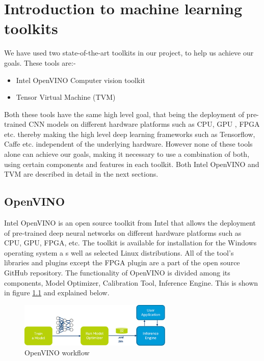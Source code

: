 \chapter{Introduction to machine learning toolkits}
We have used two state-of-the-art toolkits in our project, to help us achieve our goals. These tools are:-
\begin{itemize}
    \item Intel OpenVINO Computer vision toolkit
    \item Tensor Virtual Machine (TVM)
\end{itemize}
Both these tools have the same high level goal, that being the deployment of pre-trained CNN models on different hardware platforms such as CPU, GPU , FPGA etc. thereby making the high level deep learning frameworks such as Tensorflow, Caffe etc. independent of the underlying hardware. However none of these tools alone can achieve our goals, making it necessary to use a combination of both, using certain components and features in each toolkit. Both Intel OpenVINO and TVM are described in detail in the next sections.  

\section{OpenVINO}


Intel OpenVINO is an open source toolkit from Intel that allows the deployment of pre-trained deep neural networks on different hardware platforms such as CPU, GPU, FPGA, etc. The toolkit is available for installation for the Windows operating system a
s well as selected Linux distributions. All of the tool's libraries and plugins except the FPGA plugin are a part of the open source GitHub repository.
The functionality of OpenVINO is divided among its components, Model Optimizer, Calibration Tool, Inference Engine. This is shown in figure \ref{fig:OpenVINO_workflow} and explained below. 
\begin{figure}[!hbpt]
    \centering
    \includegraphics[width=0.65\textwidth]{img/openVINO_workflow.png}
    \caption{OpenVINO workflow \citep[cf.][]{openvino_fig}}
    \label{fig:OpenVINO_workflow}
\end{figure} 

